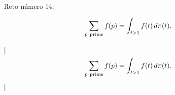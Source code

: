 

\bigskip

\enunciadoS Reto n\'umero 14:

$$\sum_{p\rm\ prime}f(p) = \int_{t>1}f(t)\,d\pi(t).$$

\bigskip

\respuestaS

|$$\sum_{p\rm\ prime}f(p) = \int_{t>1}f(t)\,d\pi(t).$$|

\bye

